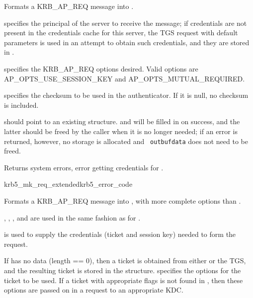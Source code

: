 Formats a KRB_AP_REQ message into .

 specifies the principal of the server to receive the
message; if credentials are not present in the credentials cache
 for this server, the TGS request with default
parameters is used in an attempt to obtain such credentials, and they
are stored in .

 specifies the KRB_AP_REQ options desired.
Valid options are
AP_OPTS_USE_SESSION_KEY and 
AP_OPTS_MUTUAL_REQUIRED.

 specifies the checksum to be used in the
authenticator.  If it is null, no checksum is included.


 should point to an existing 
structure.   and
 will be filled in on success, and the latter
should be freed by the caller when it is no longer needed; if an error
is returned, however, no storage is allocated and {\tt
outbuf{\ptsto}data} does not need to be freed.

Returns system errors, error getting credentials for
.

\begin{funcdecl}{krb5_mk_req_extended}{krb5_error_code}{\funcin}
\funcinout
{}
\funcout
{}
\end{funcdecl}

Formats a KRB_AP_REQ message into , with more complete
options than .

, , ,
and  are used in the same fashion as for
.

 is used to supply the credentials (ticket and session
key) needed to form the request.

If  has no data (length == 0), then a
ticket is obtained from either  or the TGS, and the
resulting ticket is stored in the  structure.  
 specifies the options 
for the ticket to be used. If a ticket with appropriate flags is not
found in
, then these options are passed on in a request to an
appropriate KDC.

